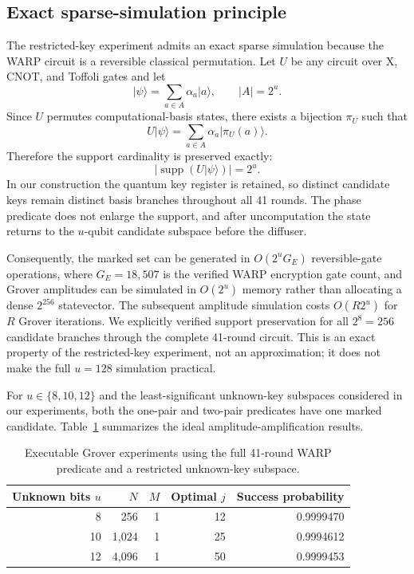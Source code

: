 \documentclass[10pt,a4paper]{article}
\providecommand{\ket}[1]{\lvert #1\rangle}
\begin{document}
\subsection{Exact sparse-simulation principle}
The restricted-key experiment admits an exact sparse simulation because the WARP circuit is a reversible classical permutation. Let $U$ be any circuit over X, CNOT, and Toffoli gates and let
\begin{equation}
    \ket{\psi}=\sum_{a\in A}\alpha_a\ket{a},
    \qquad |A|=2^u.
\end{equation}
Since $U$ permutes computational-basis states, there exists a bijection $\pi_U$ such that
\begin{equation}    U\ket{\psi}=\sum_{a\in A}\alpha_a\ket{\pi_U(a)}.
\end{equation}
Therefore the support cardinality is preserved exactly:
\begin{equation}
    \bigl|\operatorname{supp}(U\ket{\psi})\bigr|=2^u.
    \label{eq:sparse_support}
\end{equation}
In our construction the quantum key register is retained, so distinct candidate keys remain distinct basis branches throughout all 41 rounds. The phase predicate does not enlarge the support, and after uncomputation the state returns to the $u$-qubit candidate subspace before the diffuser.

Consequently, the marked set can be generated in $O(2^u G_E)$ reversible-gate operations, where $G_E=18{,}507$ is the verified WARP encryption gate count, and Grover amplitudes can be simulated in $O(2^u)$ memory rather than allocating a dense $2^{256}$ statevector. The subsequent amplitude simulation costs $O(R2^u)$ for $R$ Grover iterations. We explicitly verified support preservation for all $2^8=256$ candidate branches through the complete 41-round circuit. This is an exact property of the restricted-key experiment, not an approximation; it does not make the full $u=128$ simulation practical.

For $u\in\{8,10,12\}$ and the least-significant unknown-key subspaces considered in our experiments, both the one-pair and two-pair predicates have one marked candidate. Table~\ref{tab:exec} summarizes the ideal amplitude-amplification results.

\begin{table}[t]
\centering
\caption{Executable Grover experiments using the full 41-round WARP predicate and a restricted unknown-key subspace.}
\label{tab:exec}
\begin{tabular}{rrrrr}
\toprule
Unknown bits $u$ & $N$ & $M$ & Optimal $j$ & Success probability\\
\midrule
8 & 256 & 1 & 12 & 0.9999470\\
10 & 1,024 & 1 & 25 & 0.9994612\\
12 & 4,096 & 1 & 50 & 0.9999453\\
\bottomrule
\end{tabular}
\end{table}
\end{document}
